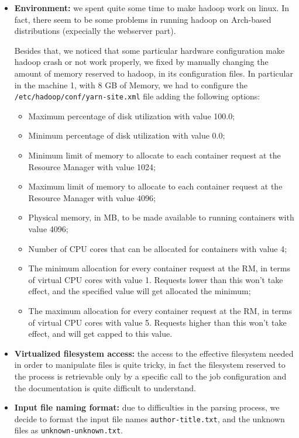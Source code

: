 \documentclass[a4paper,11pt, twoside]{article}
\begin{document}
	\begin{itemize}
		\item \textbf{Environment:} we spent quite some time to make hadoop work on linux. In fact, there seem to be some problems in running hadoop on Arch-based distributions (expecially the webserver part). 
		
		Besides that, we noticed that some particular hardware configuration make hadoop crash or not work properly, we fixed by manually changing the amount of memory reserved to hadoop, in its configuration files. In particular in the machine 1, with 8 GB of Memory, we had to configure the \texttt{/etc/hadoop/conf/yarn-site.xml} file adding the following options: 
		\begin{itemize}
			\item Maximum percentage of disk utilization with value 100.0;
			\item Minimum percentage of disk utilization with value 0.0;
			\item Minimum limit of memory to allocate to each container request at the Resource Manager with value 1024;
			\item Maximum limit of memory to allocate to each container request at the Resource Manager with value 4096;
			\item Physical memory, in MB, to be made available to running containers with value 4096;
			\item Number of CPU cores that can be allocated for containers with value 4;
			\item The minimum allocation for every container request at the RM, in terms of virtual CPU cores with value 1. Requests lower than this won't take effect, and the specified value will get allocated the minimum;
			\item The maximum allocation for every container request at the RM, in terms of virtual CPU cores with value 5. Requests higher than this won't take effect, and will get capped to this value.
		\end{itemize}
		
		\item \textbf{Virtualized filesystem access:} the access to the effective filesystem needed in order to manipulate files is quite tricky, in fact the filesystem reserved to the process is retrievable only by a specific call to the job configuration and the documentation is quite difficult to understand.
		
		\item \textbf{Input file naming format:} due to difficulties in the parsing process, we decide to format the input file names \texttt{author-title.txt}, and the unknown files as \texttt{unknown-unknown.txt}.
	\end{itemize}
\end{document}

